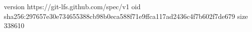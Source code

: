 version https://git-lfs.github.com/spec/v1
oid sha256:297657e30e734655388cb98b0eca588f71e9ffca117ad2436c4f7b602f7de679
size 338610
